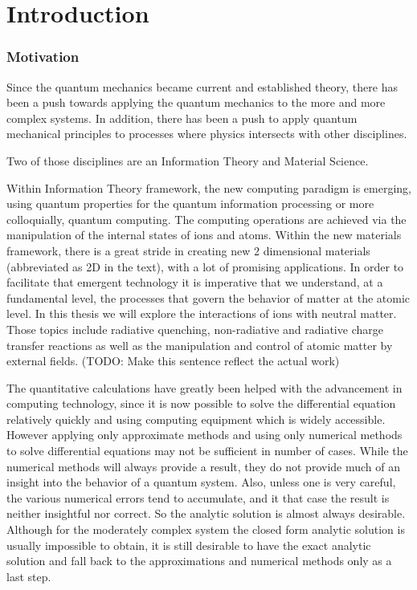 \selectfont
\setcounter{chapter}{0}
\chapter*{\textbf{Introduction}}

\label{introduction}
 
\subsection*{Motivation}

Since the quantum mechanics  became current and established theory, there has been a push towards applying the quantum mechanics to the more and more complex systems. In addition, there  has been a push to apply quantum mechanical principles to processes where physics intersects with other disciplines.

Two of those disciplines are an Information Theory and Material Science.

Within Information Theory framework, the new computing paradigm is emerging, using quantum properties for the quantum information processing \cite{QIP} or more colloquially, quantum computing. The computing operations are achieved via the manipulation of the internal states of ions and atoms. Within the new materials framework, there is a great stride in creating new 2 dimensional materials (abbreviated as 2D in the text), with a lot of promising applications.\cite{Nature2D}
In order to facilitate that emergent technology it is imperative that we understand, at a fundamental level, the processes that govern the behavior of matter at the atomic level. In this thesis we will explore the interactions of ions with neutral matter. Those topics include radiative quenching, non-radiative and radiative charge transfer reactions as well as the manipulation and control of atomic matter by external fields. (TODO: Make this sentence reflect the actual work)

The quantitative calculations have greatly been helped with the advancement in computing technology, since it is now possible to solve the differential equation relatively quickly and using computing equipment which is widely accessible.  However applying only approximate methods and using only numerical methods to solve differential equations may not be sufficient in number of cases. While the numerical methods will always provide a result, they do not provide much of an insight into the behavior of a quantum system. Also, unless one is very careful, the various numerical errors tend to accumulate, and it that case the result is neither insightful nor correct. So the analytic solution is almost always desirable. Although for the moderately complex system the closed form analytic solution is usually impossible to obtain, it is still desirable to have the exact analytic solution and fall back to the approximations and numerical methods only as a last step.

